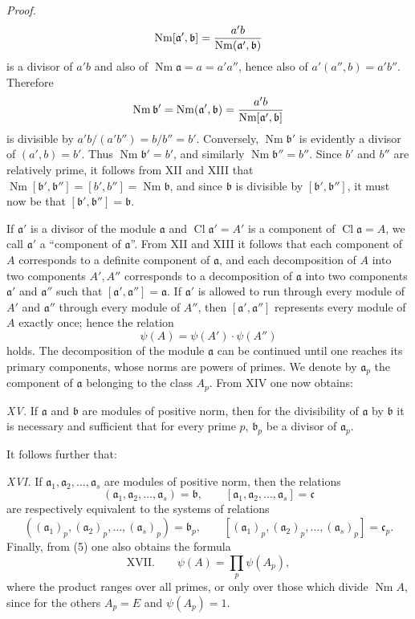 \documentclass[11pt,a4paper]{article}
\newcommand{\Cl}{\operatorname{Cl}}
\newcommand{\Nm}{\operatorname{Nm}}
\begin{document}
\emph{Proof.}
\[
 \Nm[\mathfrak a',\mathfrak b]
 ={a'b\over \Nm(\mathfrak a',\mathfrak b)}
\]
is a divisor of $a'b$ and also of $\Nm\mathfrak a=a=a'a''$, hence also of $a'(a'',b)=a'b''$. Therefore
\[
 \Nm\mathfrak b'=\Nm(\mathfrak a',\mathfrak b)
 ={a'b\over \Nm[\mathfrak a',\mathfrak b]}
\]
is divisible by $a'b/(a'b'')=b/b''=b'$. Conversely, $\Nm\mathfrak b'$ is evidently a divisor of $(a',b)=b'$. Thus $\Nm\mathfrak b'=b'$, and similarly $\Nm\mathfrak b''=b''$. Since $b'$ and $b''$ are relatively prime, it follows from XII and XIII that $\Nm[\mathfrak b',\mathfrak b'']=[b',b'']=\Nm\mathfrak b$, and since $\mathfrak b$ is divisible by $[\mathfrak b',\mathfrak b'']$, it must now be that $[\mathfrak b',\mathfrak b'']=\mathfrak b$.

If $\mathfrak a'$ is a divisor of the module $\mathfrak a$ and $\Cl\mathfrak a'=A'$ is a component of $\Cl\mathfrak a=A$, we call $\mathfrak a'$ a ``component of $\mathfrak a$''. From XII and XIII it follows that each component of $A$ corresponds to a definite component of $\mathfrak a$, and each decomposition of $A$ into two components $A',A''$ corresponds to a decomposition of $\mathfrak a$ into two components $\mathfrak a'$ and $\mathfrak a''$ such that $[\mathfrak a',\mathfrak a'']=\mathfrak a$. If $\mathfrak a'$ is allowed to run through every module of $A'$ and $\mathfrak a''$ through every module of $A''$, then $[\mathfrak a',\mathfrak a'']$ represents every module of $A$ exactly once; hence the relation
\begin{equation}
 \psi(A)=\psi(A')\cdot\psi(A'')
\tag{5}
\end{equation}
holds. The decomposition of the module $\mathfrak a$ can be continued until one reaches its primary components, whose norms are powers of primes. We denote by $\mathfrak a_p$ the component of $\mathfrak a$ belonging to the class $A_p$. From XIV one now obtains:

\emph{XV.} If $\mathfrak a$ and $\mathfrak b$ are modules of positive norm, then for the divisibility of $\mathfrak a$ by $\mathfrak b$ it is necessary and sufficient that for every prime $p$, $\mathfrak b_p$ be a divisor of $\mathfrak a_p$.

It follows further that:

\emph{XVI.} If $\mathfrak a_1,\mathfrak a_2,\ldots,\mathfrak a_s$ are modules of positive norm, then the relations
\[
 (\mathfrak a_1,\mathfrak a_2,\ldots,\mathfrak a_s)=\mathfrak b,
 \qquad
 [\mathfrak a_1,\mathfrak a_2,\ldots,\mathfrak a_s]=\mathfrak c
\]
are respectively equivalent to the systems of relations
\[
 ((\mathfrak a_1)_p,(\mathfrak a_2)_p,\ldots,(\mathfrak a_s)_p)=\mathfrak b_p,
 \qquad
 [(\mathfrak a_1)_p,(\mathfrak a_2)_p,\ldots,(\mathfrak a_s)_p]=\mathfrak c_p.
\]
Finally, from (5) one also obtains the formula
\[
\text{XVII.}\qquad \psi(A)=\prod_p \psi(A_p),
\]
where the product ranges over all primes, or only over those which divide $\Nm A$, since for the others $A_p=E$ and $\psi(A_p)=1$.
\end{document}
